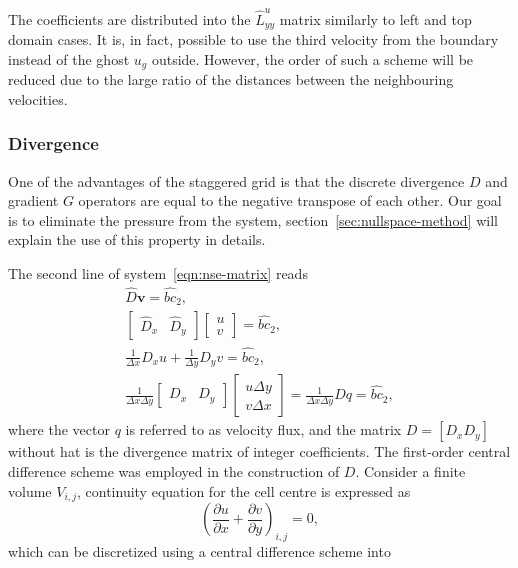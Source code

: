 \documentclass{article}
\begin{document}
The coefficients are distributed into the $\hat{L}^u_{yy}$ matrix similarly to left and top domain cases. It is, in fact, possible to use the third velocity from the boundary instead of the ghost $u_g$ outside. However, the order of such a scheme will be reduced due to the large ratio of the distances between the neighbouring velocities. 


\subsubsection{Divergence}\label{subsec:divergence}

One of the advantages of the staggered grid is that the discrete divergence $D$ and gradient $G$ operators are equal to the negative transpose of each other. Our goal is to eliminate the pressure from the system, section~\ref{sec:nullspace-method} will explain the use of this property in details. 

The second line of system~\eqref{eqn:nse-matrix} reads
\begin{equation}
\begin{gathered}
\hat{D}\boldsymbol{v}=\hat{bc}_2,\\
\left[ 
\begin{array}{ll}
\hat{D}_x & \hat{D}_y 	
\end{array}
\right]\left[\begin{array}{l}
u\\
v
\end{array}
\right]=\hat{bc}_2
, \\
\frac{1}{\Delta x} D_x u+\frac{1}{\Delta y} D_y v=\hat{bc}_2, \\
\frac{1}{\Delta x \Delta y}\left[\begin{array}{ll}
D_x & D_y
\end{array}\right]\left[\begin{array}{l}
u \Delta y \\
v \Delta x
\end{array}\right]=\frac{1}{\Delta x \Delta y} D q=\hat{bc}_2,
\end{gathered}
\end{equation}
where the vector $q$ is referred to as velocity flux, and the matrix $D=[D_x D_y]$ without hat is the divergence matrix of integer coefficients. The first-order central difference scheme was employed in the construction of $D$. Consider a finite volume $V_{i,j}$, continuity equation for the cell centre is expressed as
\begin{equation}
	\left(\frac{\partial u}{\partial x} + \frac{\partial v}{\partial y}\right)_{i,j}=0,
\end{equation}
which can be discretized using a central difference scheme into
\end{document}
